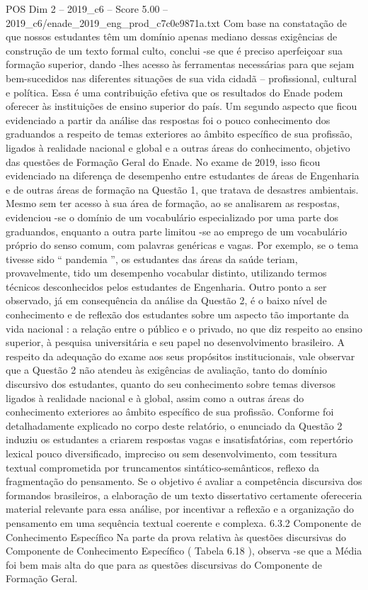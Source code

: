 \begin{textsample}{POS Dim 2 – 2019\_c6 – Score 5.00 – 2019\_c6/enade\_2019\_eng\_prod\_c7c0e9871a.txt}
Com base na constatação de que nossos estudantes têm um domínio apenas mediano dessas exigências de construção de um texto formal culto, conclui -se que é preciso aperfeiçoar sua formação superior, dando -lhes acesso às ferramentas necessárias para que sejam bem-sucedidos nas diferentes situações de sua vida cidadã – profissional, cultural e política.
Essa é uma contribuição efetiva que os resultados do Enade podem oferecer às instituições de ensino superior do país.
Um segundo aspecto que ficou evidenciado a partir da análise das respostas foi o pouco conhecimento dos graduandos a respeito de temas exteriores ao âmbito específico de sua profissão, ligados à realidade nacional e global e a outras áreas do conhecimento, objetivo das questões de Formação Geral do Enade.
No exame de 2019, isso ficou evidenciado na diferença de desempenho entre estudantes de áreas de Engenharia e de outras áreas de formação na Questão 1, que tratava de desastres ambientais.
Mesmo sem ter acesso à sua área de formação, ao se analisarem as respostas, evidenciou -se o domínio de um vocabulário especializado por uma parte dos graduandos, enquanto a outra parte limitou -se ao emprego de um vocabulário próprio do senso comum, com palavras genéricas e vagas.
Por exemplo, se o tema tivesse sido “ pandemia ”, os estudantes das áreas da saúde teriam, provavelmente, tido um desempenho vocabular distinto, utilizando termos técnicos desconhecidos pelos estudantes de Engenharia.
Outro ponto a ser observado, já em consequência da análise da Questão 2, é o baixo nível de conhecimento e de reflexão dos estudantes sobre um aspecto tão importante da vida nacional : a relação entre o público e o privado, no que diz respeito ao ensino superior, à pesquisa universitária e seu papel no desenvolvimento brasileiro.
A respeito da adequação do exame aos seus propósitos institucionais, vale observar que a Questão 2 não atendeu às exigências de avaliação, tanto do domínio discursivo dos estudantes, quanto do seu conhecimento sobre temas diversos ligados à realidade nacional e à global, assim como a outras áreas do conhecimento exteriores ao âmbito específico de sua profissão.
Conforme foi detalhadamente explicado no corpo deste relatório, o enunciado da Questão 2 induziu os estudantes a criarem respostas vagas e insatisfatórias, com repertório lexical pouco diversificado, impreciso ou sem desenvolvimento, com tessitura textual comprometida por truncamentos sintático-semânticos, reflexo da fragmentação do pensamento.
Se o objetivo é avaliar a competência discursiva dos formandos brasileiros, a elaboração de um texto dissertativo certamente ofereceria material relevante para essa análise, por incentivar a reflexão e a organização do pensamento em uma sequência textual coerente e complexa. 6.3.2 Componente de Conhecimento Específico Na parte da prova relativa às questões discursivas do Componente de Conhecimento Específico ( Tabela 6.18 ), observa -se que a Média foi bem mais alta do que para as questões discursivas do Componente de Formação Geral.

\end{textsample}
